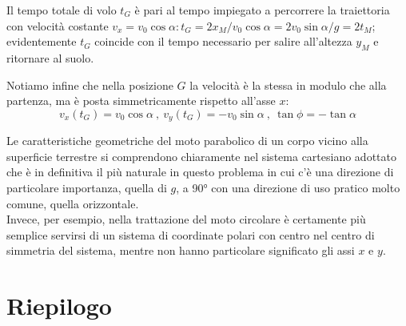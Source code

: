 \documentclass[class=book, crop=false, oneside, 12pt]{standalone}
\begin{document}
Il tempo totale di volo \(t_G\) è pari al tempo impiegato a percorrere la traiettoria con velocità costante \(v_x = v_0 \cos \alpha : t_G = 2 x_M /v_0 \cos \alpha = 2v_0 \sin \alpha / g = 2 t_M\);
evidentemente \(t_G\) coincide con il tempo necessario per salire all'altezza \(y_M\) e ritornare al suolo.

Notiamo infine che nella posizione \(G\) la velocità è la stessa in modulo che alla partenza, ma è posta simmetricamente rispetto all'asse \(x\):
\begin{equation}
  v_x(t_G) = v_0 \cos \alpha \ , \ v_y (t_G) = -v_0 \sin \alpha \ , \ \tan \phi = - \tan \alpha
\end{equation}

Le caratteristiche geometriche del moto parabolico di un corpo vicino alla superficie terrestre si comprendono chiaramente nel sistema cartesiano adottato che è in definitiva il più naturale in questo problema in cui c'è una direzione di particolare importanza,
quella di \(g\), a 90° con una direzione di uso pratico molto comune, quella orizzontale.\\
Invece, per esempio, nella trattazione del moto circolare è certamente più semplice servirsi di un sistema di coordinate polari con centro nel centro di simmetria del sistema, mentre non hanno particolare significato gli assi \(x\) e \(y\).

\section{Riepilogo}
\end{document}
